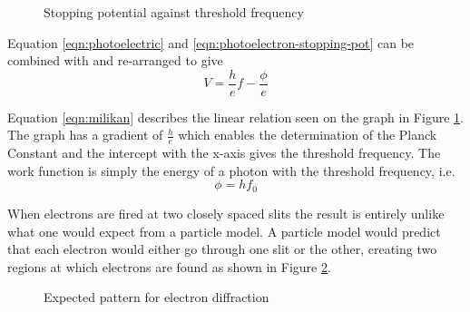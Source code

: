 \documentclass[revision-guide.tex]{subfiles}
\begin{document}
\begin{figure}[ht]
  \begin{center}
  \end{center}
  \caption{Stopping potential against threshold frequency}
  \label{fig:milikan-results}
\end{figure}

Equation \ref{eqn:photoelectric} and \ref{eqn:photoelectron-stopping-pot} can be combined with  and re-arranged to give
\begin{equation}\label{eqn:milikan}
V = \frac{h}{e}f - \frac{\phi}{e}
\end{equation}

Equation \ref{eqn:milikan} describes the linear relation seen on the graph in Figure \ref{fig:milikan-results}. The graph has a gradient of $\frac{h}{e}$ which enables the determination of the Planck Constant and the intercept with the x-axis gives the threshold frequency. The work function is simply the energy of a photon with the threshold frequency, i.e.
\begin{equation}
  \phi = hf_0
\end{equation}


When electrons are fired at two closely spaced slits the result is entirely unlike what one would expect from a particle model. A particle model would predict that each electron would either go through one slit or the other, creating two regions at which electrons are found as shown in Figure \ref{fig:electron-diff-expected}.

\begin{figure}[h]
  \begin{center}
  \end{center}
  \caption{Expected pattern for electron diffraction}
  \label{fig:electron-diff-expected}
\end{figure}
\end{document}
